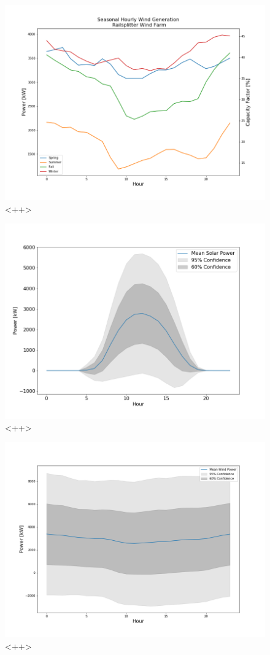\begin{figure}[H]
	\centering
	\includegraphics[width=\columnwidth]{./img/cap/seasonal_hourly_wind.png}
	\caption{<++>}
	\label{fig:<++>}
\end{figure}

\begin{figure}[H]
	\centering
	\includegraphics[width=\columnwidth]{./img/cap/solar_mean.png}
	\caption{<++>}
	\label{fig:<++>}
\end{figure}

\begin{figure}[H]
	\centering
	\includegraphics[width=\columnwidth]{./img/cap/wind_mean.png}
        \caption{<++>}
	\label{fig:<++>}
\end{figure}
